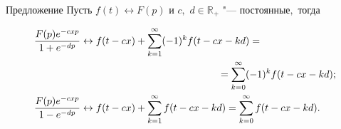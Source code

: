 \begin{newthm}{Предложение} Пусть $f(t)\leftrightarrow F(p)$ и $c,$ $d\in \mathbb R_+$ "--- постоянные$,$ тогда

\begin{equation}

\label{kogan:eq29}

\begin{aligned}

&\frac{F(p)e^{-cxp}}{1+e^{-dp}}\leftrightarrow 

f(t-cx)+\sum\limits_{k=1}^\infty (-1)^kf(t-cx-kd) =

\\ 

& \hspace{6.5cm} =\sum\limits_{k=0}^\infty (-1)^kf( t-cx-kd);\\

&\frac{F(p)e^{-cxp}}{1-e^{-dp}}\leftrightarrow 

f(t-cx)+\sum\limits_{k=1}^\infty f(t-cx-kd)=\sum\limits_{k=0}^\infty f(t-cx-kd).

\end{aligned}

\end{equation}

\end{newthm}



\smallskip



